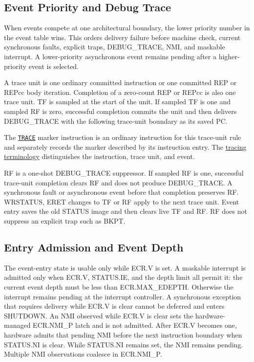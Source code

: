 \subsection{Event Priority and Debug Trace}\label{section:event-priority-and-debug-trace}
When events compete at one architectural boundary, the lower priority number in the event table wins. This orders
delivery failure before machine check, current synchronous faults, explicit traps, DEBUG\_TRACE, NMI, and maskable
interrupt. A lower-priority asynchronous event remains pending after a higher-priority event is selected.

A trace unit is one ordinary committed instruction or one committed REP or REPcc body iteration. Completion of a
zero-count REP or REPcc is also one trace unit. TF is sampled at the start of
the unit. If sampled TF is one and sampled RF is zero, successful completion commits the unit and then
delivers DEBUG\_TRACE with the following trace-unit boundary as its saved PC.

The \hyperref[instr:trace]{\texttt{TRACE}} marker instruction is an ordinary instruction for this trace-unit rule
and separately records the marker described by its instruction entry. The
\hyperref[section:tracing-terminology]{tracing terminology} distinguishes the instruction, trace unit, and event.

RF is a one-shot DEBUG\_TRACE suppressor. If sampled RF is one, successful trace-unit completion clears RF and does
not produce DEBUG\_TRACE. A synchronous fault or asynchronous event before that completion preserves RF. WRSTATUS,
ERET changes to TF or RF apply to the next trace unit. Event entry saves the old STATUS image and then
clears live TF and RF. RF does not suppress an explicit trap such as BKPT.

\subsection{Entry Admission and Event Depth}
The event-entry state is usable only while ECR.V is set. A maskable interrupt is admitted only when ECR.V,
STATUS.IE, and the depth limit all permit it: the current event depth must be less than ECR.MAX\_EDEPTH. Otherwise the
interrupt remains pending at the interrupt controller. A synchronous exception that requires delivery while ECR.V is
clear cannot be deferred and enters SHUTDOWN. An NMI observed while ECR.V is clear sets the hardware-managed
ECR.NMI\_P latch and is not admitted. After ECR.V becomes one, hardware admits that pending NMI before the next
instruction boundary when STATUS.NI is clear. While STATUS.NI remains set, the NMI remains pending. Multiple NMI
observations coalesce in ECR.NMI\_P.

